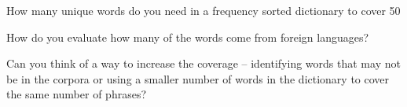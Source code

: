 \documentclass{article}
\begin{document}
How many unique words do you need in a frequency sorted dictionary to cover 50%

How do you evaluate how many of the words come from foreign languages? 

Can you think of a way to increase the coverage -- identifying words that may not be in the corpora or using a smaller number of words in the dictionary to cover the same number of phrases?
\end{document}
